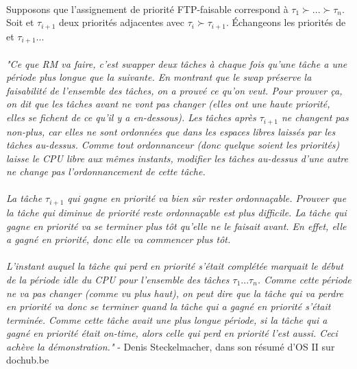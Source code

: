 \paragraph{}
Supposons que l'assignement de priorité FTP-faisable correspond à $\tau_{1} \succ ... \succ \tau_{n}$. Soit \ti et $\tau_{i+1}$ deux priorités adjacentes avec $\tau_{i} \succ \tau_{i+1}$. Échangeons les priorités de \ti et $\tau_{i+1}$...

\paragraph{}\textit{"Ce que RM va faire, c’est swapper deux tâches à chaque fois qu’une tâche a une période plus longue que la suivante. 
En montrant que le swap préserve la faisabilité de l’ensemble des tâches, on a prouvé ce qu’on veut. Pour prouver ça, on dit que les tâches avant \ti ne vont pas changer (elles ont une haute priorité, elles se fichent de ce qu’il y a en-dessous). 
Les tâches après $\tau_{i+1}$ ne changent pas non-plus, car elles ne sont ordonnées que dans les espaces libres laissés par les tâches au-dessus. 
Comme tout ordonnanceur (donc quelque soient les priorités) laisse le CPU libre aux mêmes instants, modifier les tâches au-dessus d’une autre ne change pas l’ordonnancement de cette tâche.}

\paragraph{}\textit{La tâche $\tau_{i+1}$ qui gagne en priorité va bien sûr rester ordonnaçable.
Prouver que la tâche qui diminue de priorité reste ordonnaçable est plus difficile. La tâche qui gagne
en priorité va se terminer plus tôt qu’elle ne le faisait avant. En effet, elle a gagné en priorité, donc elle va commencer plus tôt.}

\paragraph{}\textit{L’instant auquel la tâche qui perd en priorité s’était complétée marquait le début de la période idle du CPU pour l’ensemble des tâches $\tau_{1} ... \tau_{n}$. Comme cette période ne va pas changer (comme vu plus haut), on peut dire que la tâche qui va perdre en priorité va donc se terminer quand la tâche qui a gagné en priorité s’était terminée. Comme cette tâche avait une plus longue période, si la tâche qui a gagné en priorité était on-time, alors celle qui perd en priorité l’est
aussi. Ceci achève la démonstration."} - Denis Steckelmacher, dans son résumé d'OS II sur dochub.be

